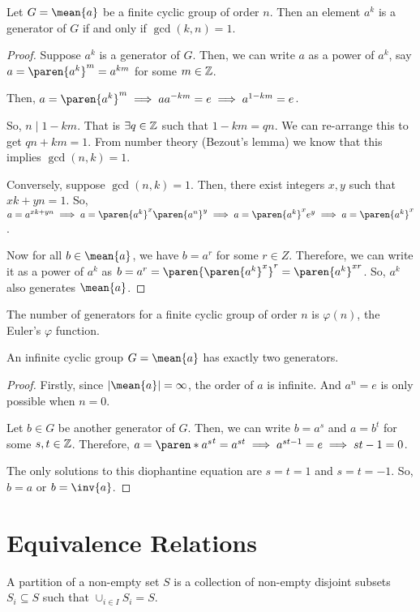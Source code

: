 \documentclass[11pt]{penrose}
\newcommand{\cyclic}[1]{\mean{#1}}
\newcommand{\keyword}[1]{\textsf{#1}}
\begin{document}
\begin{nthm}
    Let $G = \cyclic{a}$ be a finite cyclic group of order $n$. Then an element $a^k$ is a generator of $G$ if and only if $\gcd(k,n) = 1$.
\end{nthm}
\begin{proof}
    Suppose $a^k$ is a generator of $G$. Then, we can write $a$ as a power of $a^k$, say $a = \paren{a^k}^m = a^{km}$ for some $m \in \mathbb{Z}$.

    Then, $a = \paren{a^k}^m \implies a a^{-km} = e \implies a^{1-km} = e$.

    So, $n \mid 1 - km$. That is $\exists q \in \mathbb{Z}$ such that $1 - km = qn$. We can re-arrange this to get $qn + km = 1$. From number theory (Bezout's lemma) we know that this implies $\gcd(n,k)=1$.

    Conversely, suppose $\gcd(n,k)=1$. Then, there exist integers $x, y$ such that $xk + yn = 1$. So, $a = a^{xk + yn} \implies a = \paren{a^{k}}^{x} \paren{a^{n}}^{y} \implies a = \paren{a^{k}}^{x} e^{y} \implies a = \paren{a^{k}}^{x}$.

    Now for all $b \in \cyclic{a}$, we have $b = a^r$ for some $r \in Z$. Therefore, we can write it as a power of $a^k$ as $b = a^r = \paren{\paren{a^{k}}^{x}}^{r} = \paren{a^{k}}^{xr}$. So, $a^k$ also generates $\cyclic{a}$.
\end{proof}

\begin{remark}
    The number of generators for a finite cyclic group of order $n$ is $\varphi(n)$, the Euler's $\varphi$ function.
\end{remark}

\begin{nthm}
    An infinite cyclic group $G = \cyclic{a}$ has exactly two generators.
\end{nthm}
\begin{proof}
    Firstly, since $|\cyclic{a}| = \infty$, the order of $a$ is infinite. And $a^n = e$ is only possible when $n = 0$.

    Let $b \in G$ be another generator of $G$. Then, we can write $b = a^s$ and $a = b^t$ for some $s, t \in \mathbb{Z}$. Therefore, $a = \paren*{a^{s}}^{t} = a^{st} \implies a^{st-1} = e \implies st-1 = 0$.
    
    The only solutions to this diophantine equation are $s=t=1$ and $s=t=-1$. So, $b = a$ or $b = \inv{a}$.
\end{proof}

\section{Equivalence Relations}
\begin{ndfn}
    A \keyword{partition} of a non-empty set $S$ is a collection of non-empty disjoint subsets $S_i \subseteq S$ such that $\cup_{i \in I} S_i = S$.
\end{ndfn}
\end{document}
